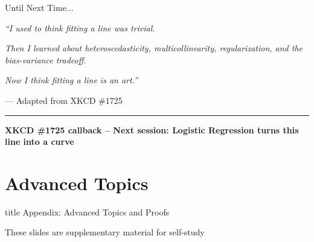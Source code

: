 \documentclass[8pt,aspectratio=169]{beamer}
\newcommand{\bottomnote}[1]{%
\vfill
\vspace{-2mm}
\textcolor{mllavender2}{\rule{\textwidth}{0.4pt}}
\vspace{1mm}
\footnotesize
\textbf{#1}
}
\begin{document}
\begin{frame}[t]{Until Next Time...}
\begin{center}
\large
\textit{``I used to think fitting a line was trivial.}

\vspace{0.5em}
\textit{Then I learned about heteroscedasticity, multicollinearity, regularization, and the bias-variance tradeoff.}

\vspace{0.5em}
\textit{Now I think fitting a line is an art.''}

\vspace{0.8em}
\normalsize
--- Adapted from XKCD \#1725
\end{center}

\bottomnote{XKCD \#1725 callback -- Next session: Logistic Regression turns this line into a curve}
\end{frame}

\appendix

\section*{Advanced Topics}

\begin{frame}[t]
\vfill
\centering
\begin{beamercolorbox}[sep=8pt,center]{title}
\Large Appendix: Advanced Topics and Proofs\par
\vspace{0.3em}
\normalsize These slides are supplementary material for self-study
\end{beamercolorbox}
\vfill
\end{frame}
\end{document}
